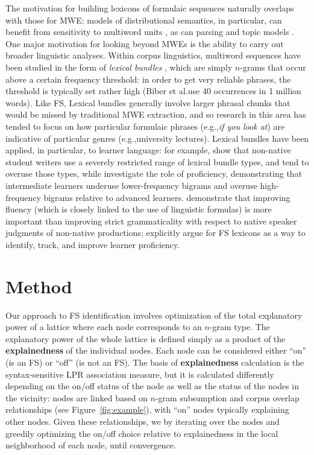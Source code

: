 \documentclass[11pt,letterpaper]{article}
\makeatletter
\def \eg {e.g.,\@ }
\def \al {al.\@ }
\newcommand{\termdef}[1]{\textbf{#1}\xspace}
\newcommand{\figref}[2][]{Figure#1~\ref{#2}\xspace}
\makeatother
\begin{document}
The motivation for building lexicons of formulaic sequences naturally overlaps with those for MWE: models of distributional semantics, in particular, can benefit from sensitivity to multiword units \cite{Cohen:Widdows:2009}, as can parsing \cite{Constant16} and topic models \cite{Lau+:2012b}. One major motivation for looking beyond MWEs is the ability to carry out broader linguistic analyses. Within corpus linguistics, multiword sequences have been studied in the form of \textit{lexical bundles} \cite{Biber04}, which are simply $n$-grams that occur above a certain frequency threshold: in order to get very reliable phrases, the threshold is typically set rather high (Biber et \al use 40 occurrences in 1 million words). Like FS, Lexical bundles generally involve larger phrasal chunks that would be missed by traditional MWE extraction, and so research in this area has tended to focus on how particular formulaic phrases (\eg \textit{if you look at}) are indicative of particular genres (\eg university lectures). Lexical bundles have been applied, in particular, to learner language: for example,   show that non-native student writers use a severely restricted range of lexical bundle types, and tend to overuse those types, while  investigate the role of proficiency, demonstrating that intermediate learners underuse lower-frequency bigrams and overuse high-frequency bigrams relative to advanced learners.  demonstrate that improving fluency (which is closely linked to the use of linguistic formulas) is more important than improving strict grammaticality with respect to native speaker judgments of non-native productions;  explicitly argue for FS lexicons as a way to identify, track, and improve learner proficiency.


\section{Method}

Our approach to FS identification involves optimization of the total explanatory power of a lattice where each node corresponds to an $n$-gram type. The explanatory power of the whole lattice is defined simply as a product of the \termdef{explainedness} of the individual nodes. Each node can be considered either ``on'' (is an FS) or ``off'' (is not an FS). The basis of \termdef{explainedness} calculation is the syntax-sensitive LPR association measure, but it is calculated differently depending on the on/off status of the node as well as the status of the nodes in the vicinity: nodes are linked based on $n$-gram subsumption and corpus overlap relationships (see \figref{fig:example}), with ``on'' nodes typically explaining other nodes.  Given these relationships, we by iterating over the nodes and greedily optimizing the on/off choice relative to explainedness in the local neighborhood of each node, until convergence.
\end{document}

